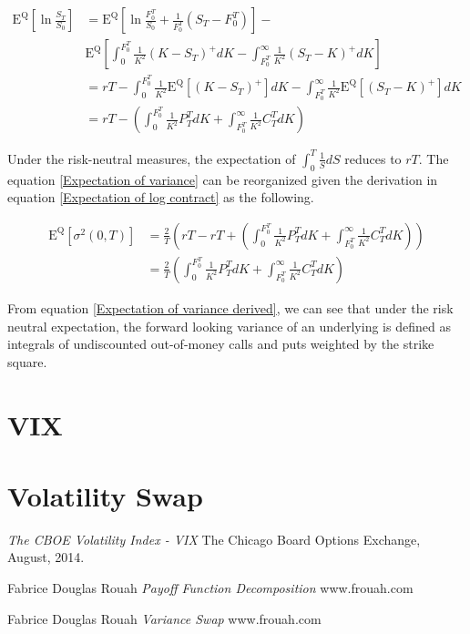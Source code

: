 \documentclass{article}
\begin{document}
\begin{align} \label{Expectation of log contract}
    \mathrm{E}^{\mathrm{Q}}{\left[\ln{\frac{S_T}{S_0}}\right]} &= \mathrm{E}^{\mathrm{Q}}{\left[\ln{\frac{F_0^T}{S_0}} + \frac{1}{F_0^T} \left(S_T - F_0^T\right)\right]} - \nonumber \\ 
    & \mathrm{E}^{\mathrm{Q}}{\left[\int_{0}^{F_0^T}{\frac{1}{K^2} \left(K - S_T\right)^+ dK} - \int_{F_0^T}^{\infty}{\frac{1}{K^2} \left(S_T - K\right)^+ dK}\right]} \nonumber \\
    &= r T - \int_{0}^{F_0^T}{\frac{1}{K^2} \mathrm{E}^{\mathrm{Q}}{\left[\left(K - S_T\right)^+\right]} dK} - \int_{F_0^T}^{\infty}{\frac{1}{K^2} \mathrm{E}^{\mathrm{Q}}{\left[\left(S_T - K\right)^+\right]} dK} \nonumber \\
    &= rT - \left(\int_{0}^{F_0^T}{\frac{1}{K^2} P_T^T dK} + \int_{F_0^T}^{\infty}{\frac{1}{K^2} C_T^T dK} \right)
\end{align}

Under the risk-neutral measures, the expectation of $ \int_0^T{\frac{1}{S} dS} $ reduces to $ r T $. The equation \ref{Expectation of variance} can be reorganized given the derivation in equation \ref{Expectation of log contract} as the following.

\begin{align} \label{Expectation of variance derived}
    \mathrm{E}^{\mathrm{Q}}{\left[\sigma^2(0, T)\right]} &= \frac{2}{T} \left(r T - r T + \left(\int_{0}^{F_0^T}{\frac{1}{K^2} P_T^T dK} + \int_{F_0^T}^{\infty}{\frac{1}{K^2} C_T^T dK} \right) \right) \nonumber \\
    &= \frac{2}{T} \left( \int_{0}^{F_0^T}{\frac{1}{K^2} P_T^T dK} + \int_{F_0^T}^{\infty}{\frac{1}{K^2} C_T^T dK} \right)
\end{align}

From equation \ref{Expectation of variance derived}, we can see that under the risk neutral expectation, the forward looking variance of an underlying is defined as integrals of undiscounted out-of-money calls and puts weighted by the strike square.


\section{VIX}


\section{Volatility Swap}



\begin{thebibliography}{9}

\textit{The CBOE Volatility Index - VIX}
The Chicago Board Options Exchange, August, 2014.

Fabrice Douglas Rouah
\textit{Payoff Function Decomposition}
www.frouah.com

Fabrice Douglas Rouah
\textit{Variance Swap}
www.frouah.com


\end{thebibliography}
\end{document}
